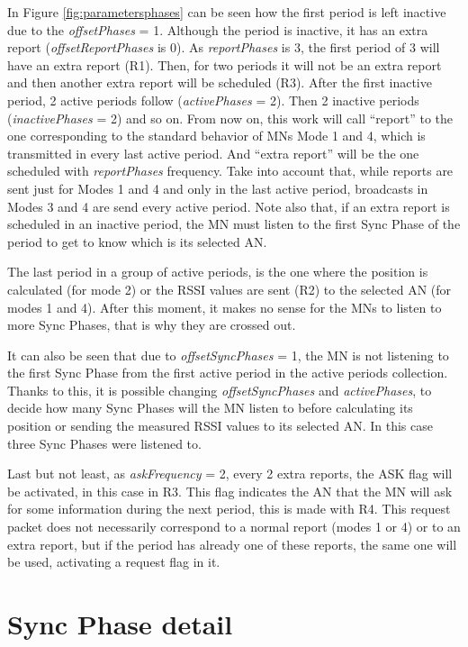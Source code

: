 In Figure \ref{fig:parametersphases} can be seen how the first period is left inactive due to the \textit{offsetPhases} = 1. Although the period
is inactive, it has an extra report (\textit{offsetReportPhases} is 0). As \textit{reportPhases} is 3, the first period of 3 will have an extra report (R1). 
Then, for two periods it will not be an extra report and then another extra report will be scheduled (R3). After the first inactive period, 2 active 
periods follow (\textit{activePhases} = 2). Then 2 inactive periods (\textit{inactivePhases} = 2) and so on. From now on, this work will call ``report'' to the one 
corresponding to the standard behavior of \acp{MN} Mode 1 and 4, which is transmitted in every last active period. And ``extra report'' will be 
the one scheduled with \textit{reportPhases} frequency. Take into account that, while reports are sent just for Modes 1 and 4 and only in the last active period,
broadcasts in Modes 3 and 4 are send every active period. Note also that, if an extra report is scheduled in an inactive period, the \ac{MN} must
listen to the first Sync Phase of the period to get to know which is its selected \ac{AN}.

The last period in a group of active periods, is the one where the position is calculated (for mode 2) or the \ac{RSSI} values are sent (R2) to the selected 
\ac{AN} (for modes 1 and 4). After this moment, it makes no sense for the \acp{MN} to listen to more Sync Phases, that is why they are crossed out. 

It can also be seen that due to \textit{offsetSyncPhases} = 1, the \ac{MN} is not listening to the first Sync Phase from the first active period in the active
periods collection. Thanks to this, it is possible changing \textit{offsetSyncPhases} and \textit{activePhases}, to decide how many Sync Phases will the \ac{MN}
listen to before calculating its position or sending the measured \ac{RSSI} values to its selected \ac{AN}. In this case three Sync Phases were listened to.

Last but not least, as \textit{askFrequency} = 2, every 2 extra reports, the ASK flag will be activated, in this case in R3. This flag indicates the 
\ac{AN} that the \ac{MN} will ask for some information during the next period, this is made with R4. This request packet does not necessarily correspond
to a normal report (modes 1 or 4) or to an extra report, but if the period has already one of these reports, the same one will be used, activating a request
flag in it.


\section{Sync Phase detail}

